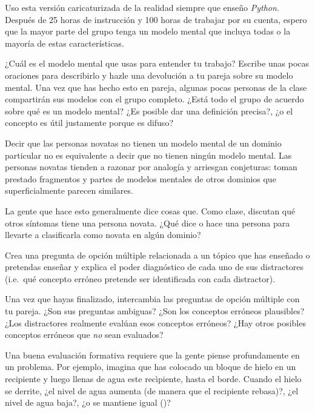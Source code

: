 Uso esta versión caricaturizada de la realidad siempre que enseño \emph{Python}.
Después de 25 horas de instrucción y 100 horas de trabajar por su cuenta,
espero que la mayor parte del grupo tenga un modelo mental
que incluya todas o la mayoría de estas características.



¿Cuál es el modelo mental que usas para entender tu trabajo?
Escribe unas pocas oraciones para describirlo y hazle una devolución a tu pareja sobre su modelo mental.
Una vez que has hecho esto en pareja,
algunas pocas personas de la clase compartirán sus modelos con el grupo completo.
¿Está todo el grupo de acuerdo sobre qué es un modelo mental?
¿Es posible dar una definición precisa?,
¿o el concepto es útil justamente porque es difuso?

Decir que las personas novatas no tienen un modelo mental de un dominio particular
no es equivalente a decir que no tienen ningún modelo mental.
Las personas novatas tienden a razonar por analogía y arriesgan conjeturas:
toman prestado fragmentos y partes de modelos mentales de otros dominios que superficialmente parecen similares.

La gente que hace esto generalmente dice cosas que.
Como clase,
discutan qué otros síntomas tiene una persona novata.
¿Qué dice o hace una persona para llevarte a clasificarla como novata en algún dominio?

Crea una pregunta de opción múltiple relacionada a un tópico que has enseñado o pretendas enseñar
y explica el poder diagnóstico de cada uno de sus distractores
(i.e.\ qué concepto erróneo pretende ser identificada con cada distractor).

Una vez que hayas finalizado, intercambia las preguntas de opción múltiple con tu pareja.
¿Son sus preguntas ambiguas?
¿Son los conceptos erróneos plausibles?
¿Los distractores realmente evalúan esos conceptos erróneos?
¿Hay otros posibles conceptos erróneos que \emph{no} sean evaluados?

Una buena evaluación formativa requiere que la gente piense profundamente en un problema.
Por ejemplo,
imagina que has colocado un bloque de hielo en un recipiente y luego llenas de agua este recìpiente, hasta el borde.
Cuando el hielo se derrite, ¿el nivel de agua aumenta (de manera que el recipiente rebasa)?, 
¿el nivel de agua baja?, ¿o se mantiene igual ()?

